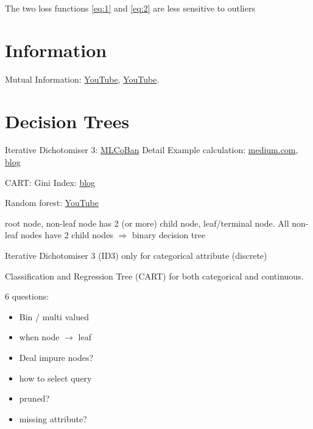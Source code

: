 The two loss functions \eqref{eq:1} and \eqref{eq:2} are less sensitive to outliers

\section{Information}

Mutual Information: \href{https://www.youtube.com/watch?v=d7AUaut6hso}{YouTube}, \href{https://www.youtube.com/watch?v=U9h1xkNELvY}{YouTube}.

\section{Decision Trees}

Iterative Dichotomiser 3: \href{https://machinelearningcoban.com/2018/01/14/id3/}{MLCoBan}
Detail Example calculation: \href{https://medium.com/@rishabhjain_22692/decision-trees-it-begins-here-93ff54ef134}{medium.com}, 
\href{https://clearpredictions.com/Home/DecisionTree}{blog}

CART: Gini Index: \href{http://www.learnbymarketing.com/481/decision-tree-flavors-gini-info-gain/}{blog}

Random forest: \href{https://www.youtube.com/watch?v=D_2LkhMJcfY}{YouTube}

 root node, non-leaf node has 2 (or more) child node, leaf/terminal node. All non-leaf nodes have 2 child nodes $\Rightarrow$ binary decision tree

Iterative Dichotomiser 3 (ID3) only for categorical attribute (discrete)

Classification and Regression Tree (CART) for both categorical and continuous.

6 questions:
\begin{itemize}
	\item Bin / multi valued
	\item when node $\rightarrow$ leaf
	\item Deal impure nodes?
	\item how to select query
	\item pruned?
	\item missing attribute?
\end{itemize}

